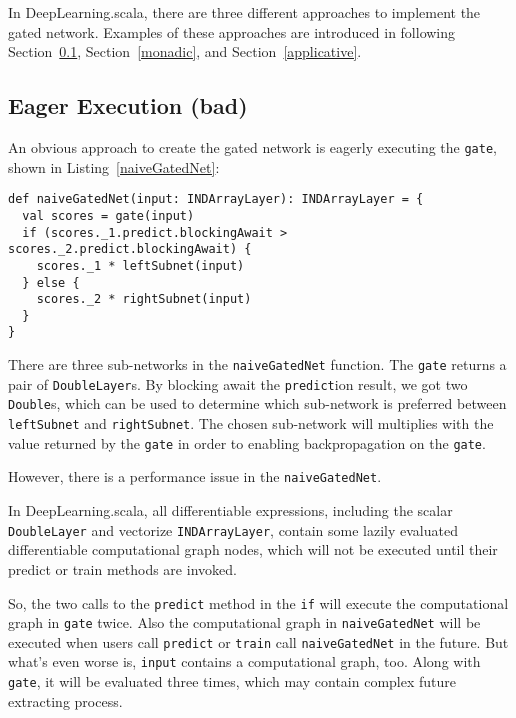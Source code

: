 In DeepLearning.scala, there are three different approaches to implement the gated network. Examples of these approaches are introduced in following Section~\ref{eager}, Section~\ref{monadic}, and Section~\ref{applicative}.

\subsection{Eager Execution (bad)}
\label{eager}

An obvious approach to create the gated network is eagerly executing the \lstinline{gate}, shown in Listing~\ref{naiveGatedNet}:

\begin{lstlisting}[float={h t b p},caption={The eager execution implementation of gated network}, label={naiveGatedNet}]
def naiveGatedNet(input: INDArrayLayer): INDArrayLayer = {
  val scores = gate(input)
  if (scores._1.predict.blockingAwait > scores._2.predict.blockingAwait) {
    scores._1 * leftSubnet(input)
  } else {
    scores._2 * rightSubnet(input)
  }
}
\end{lstlisting}

There are three sub-networks in the \lstinline{naiveGatedNet} function. The \lstinline{gate} returns a pair of \lstinline{DoubleLayer}s. By blocking await the \lstinline{predict}ion result, we got two \lstinline{Double}s, which can be used to determine which sub-network is preferred between \lstinline{leftSubnet} and \lstinline{rightSubnet}. The chosen sub-network will multiplies with the value returned by the \lstinline{gate} in order to enabling backpropagation on the \lstinline{gate}.

However, there is a performance issue in the \lstinline{naiveGatedNet}.

In DeepLearning.scala, all differentiable expressions, including the scalar \lstinline{DoubleLayer} and vectorize \lstinline{INDArrayLayer}, contain some lazily evaluated differentiable \gls{computational graph} nodes, which will not be executed until their predict or train methods are invoked.

So, the two calls to the \lstinline{predict} method in the \lstinline{if} will execute the \gls{computational graph} in \lstinline{gate} twice. Also the \gls{computational graph} in \lstinline{naiveGatedNet} will be executed when users call \lstinline{predict} or \lstinline{train} call \lstinline{naiveGatedNet} in the future. But what's even worse is, \lstinline{input} contains a \gls{computational graph}, too. Along with \lstinline{gate}, it will be evaluated three times, which may contain complex future extracting process.

